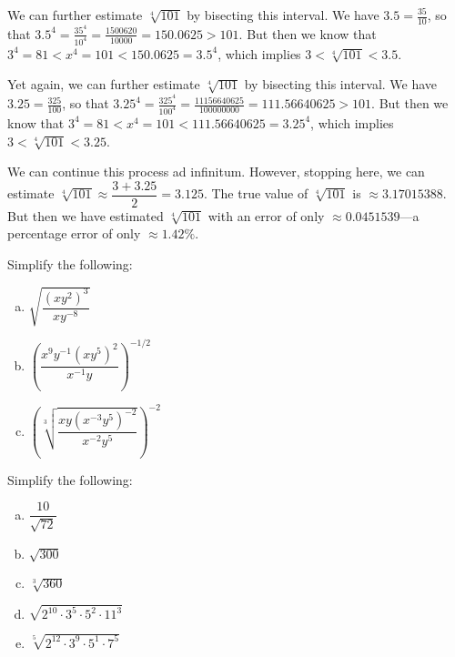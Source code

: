 \documentclass[11pt,letterpaper]{article}
\begin{document}
We can further estimate $\sqrt[4]{101}$ by bisecting this interval. We have $3.5= \frac{35}{10}$, so that $3.5^4= \frac{35^4}{10^4}= \frac{1500620}{10000}= 150.0625 > 101$. But then we know that $3^4= 81 < x^4= 101 < 150.0625= 3.5^4$, which implies $3 < \sqrt[4]{101} < 3.5$. \pspace

Yet again, we can further estimate $\sqrt[4]{101}$ by bisecting this interval. We have $3.25= \frac{325}{100}$, so that $3.25^4= \frac{325^4}{100^4}= \frac{11156640625}{100000000}= 111.56640625 > 101$. But then we know that $3^4= 81 < x^4= 101 < 111.56640625= 3.25^4$, which implies $3 < \sqrt[4]{101} < 3.25$. \pspace

We can continue this process ad infinitum. However, stopping here, we can estimate $\sqrt[4]{101} \approx \dfrac{3 + 3.25}{2}= 3.125$. The true value of $\sqrt[4]{101}$ is $\approx 3.17015388$. But then we have estimated $\sqrt[4]{101}$ with an error of only $\approx 0.0451539$---a percentage error of only $\approx 1.42\%$. 



\newpage



 Simplify the following:
	\begin{enumerate}[(a)]
	\item $\sqrt{\dfrac{(x y^2)^3}{x y^{-8}}}$
	\item $\left( \dfrac{x^9 y^{-1} (x y^5)^2}{x^{-1} y} \right)^{-1/2}$
	\item $\left( \sqrt[3]{\dfrac{xy (x^{-3} y^5)^{-2}}{x^{-2} y^5}} \right)^{-2}$
	\end{enumerate}   	



\newpage



 Simplify the following:
	\begin{enumerate}[(a)]
	\item $\dfrac{10}{\sqrt{72}}$
	\item $\sqrt{300}$
	\item $\sqrt[3]{360}$
	\item $\sqrt{2^{10} \cdot 3^5 \cdot 5^2 \cdot 11^{3}}$
	\item $\sqrt[5]{2^{12} \cdot 3^9 \cdot 5^1 \cdot 7^5}$
	\end{enumerate}   
\end{document}
